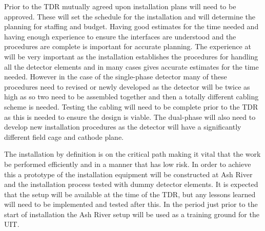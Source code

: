 Prior to the TDR mutually agreed upon installation plans will need to
be approved. These will set the schedule for the installation and will
determine the planning for staffing and budget. Having good estimates
for the time needed and having enough experience to ensure the
interfaces are understood and the procedures are complete is important
for accurate planning. The experience at  will be
very important as the  installation establishes the
procedures for handling all the detector elements and in many cases
gives accurate estimates for the time needed. However in the case of
the single-phase detector many of these procedures need to revised or
newly developed as the  detector will be twice as high as
 so two  need to be assembled together
and then a totally different cabling scheme is needed. Testing the
cabling will need to be complete prior to the TDR as this is needed to
ensure the design is viable. The dual-phase will also need to develop
new installation procedures as the   detector
will have a significantly different field cage and cathode plane.

The installation by definition is on the critical path making it vital
that the work be performed efficiently and in a manner that has low
risk. In order to achieve this a prototype of the installation
equipment will be constructed at Ash River and the installation
process tested with dummy detector elements. It is expected that the
setup will be available at the time of the TDR, but any lessons
learned will need to be implemented and tested after this. In the
period just prior to the start of installation the Ash River setup
will be used as a training ground for the UIT.



